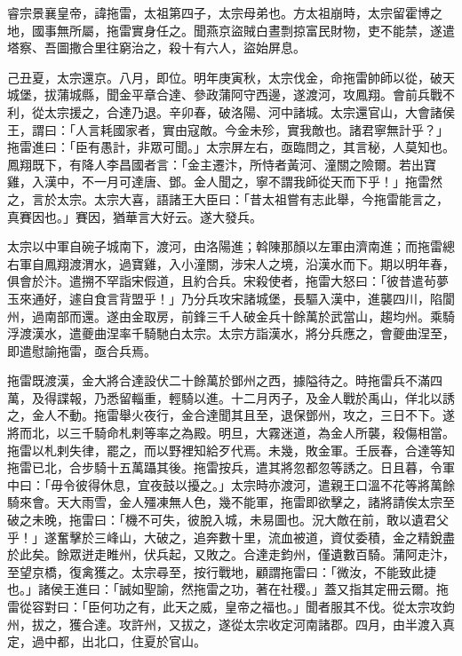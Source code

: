 
\begin{pinyinscope}

 睿宗景襄皇帝，諱拖雷，太祖第四子，太宗母弟也。方太祖崩時，太宗留霍博之地，國事無所屬，拖雷實身任之。聞燕京盜賊白晝剽掠富民財物，吏不能禁，遂遣塔察、吾圖撒合里往窮治之，殺十有六人，盜始屏息。



 己丑夏，太宗還京。八月，即位。明年庚寅秋，太宗伐金，命拖雷帥師以從，破天城堡，拔蒲城縣，聞金平章合達、參政蒲阿守西邊，遂渡河，攻鳳翔。會前兵戰不利，從太宗援之，合達乃退。辛卯春，破洛陽、河中諸城。太宗還官山，大會諸侯王，謂曰：「人言耗國家者，實由寇敵。今金未殄，實我敵也。諸君寧無計乎？」拖雷進曰：「臣有愚計，非眾可聞。」太宗屏左右，亟臨問之，其言秘，人莫知也。鳳翔既下，有降人李昌國者言：「金主遷汴，所恃者黃河、潼關之險爾。若出寶雞，入漢中，不一月可達唐、鄧。金人聞之，寧不謂我師從天而下乎！」拖雷然之，言於太宗。太宗大喜，語諸王大臣曰：「昔太祖嘗有志此舉，今拖雷能言之，真賽因也。」賽因，猶華言大好云。遂大發兵。



 太宗以中軍自碗子城南下，渡河，由洛陽進；斡陳那顏以左軍由濟南進；而拖雷總右軍自鳳翔渡渭水，過寶雞，入小潼關，涉宋人之境，沿漢水而下。期以明年春，俱會於汴。遣搠不罕詣宋假道，且約合兵。宋殺使者，拖雷大怒曰：「彼昔遣茍夢玉來通好，遽自食言背盟乎！」乃分兵攻宋諸城堡，長驅入漢中，進襲四川，陷閬州，過南部而還。遂由金取房，前鋒三千人破金兵十餘萬於武當山，趨均州。乘騎浮渡漢水，遣夔曲涅率千騎馳白太宗。太宗方詣漢水，將分兵應之，會夔曲涅至，即遣慰諭拖雷，亟合兵焉。



 拖雷既渡漢，金大將合達設伏二十餘萬於鄧州之西，據隘待之。時拖雷兵不滿四萬，及得諜報，乃悉留輜重，輕騎以進。十二月丙子，及金人戰於禹山，佯北以誘之，金人不動。拖雷舉火夜行，金合達聞其且至，退保鄧州，攻之，三日不下。遂將而北，以三千騎命札剌等率之為殿。明旦，大霧迷道，為金人所襲，殺傷相當。拖雷以札剌失律，罷之，而以野裡知給歹代焉。未幾，敗金軍。壬辰春，合達等知拖雷已北，合步騎十五萬躡其後。拖雷按兵，遣其將忽都忽等誘之。日且暮，令軍中曰：「毋令彼得休息，宜夜鼓以擾之。」太宗時亦渡河，遣親王口溫不花等將萬餘騎來會。天大雨雪，金人殭凍無人色，幾不能軍，拖雷即欲擊之，諸將請俟太宗至破之未晚，拖雷曰：「機不可失，彼脫入城，未易圖也。況大敵在前，敢以遺君父乎！」遂奮擊於三峰山，大破之，追奔數十里，流血被道，資仗委積，金之精銳盡於此矣。餘眾迸走睢州，伏兵起，又敗之。合達走鈞州，僅遺數百騎。蒲阿走汴，至望京橋，復禽獲之。太宗尋至，按行戰地，顧謂拖雷曰：「微汝，不能致此捷也。」諸侯王進曰：「誠如聖諭，然拖雷之功，著在社稷。」蓋又指其定冊云爾。拖雷從容對曰：「臣何功之有，此天之威，皇帝之福也。」聞者服其不伐。從太宗攻鈞州，拔之，獲合達。攻許州，又拔之，遂從太宗收定河南諸郡。四月，由半渡入真定，過中都，出北口，住夏於官山。




\end{pinyinscope}
